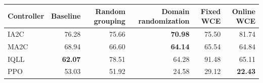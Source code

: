 \begin{tabular}{lrrrrr}
\hline
Controller & Baseline & Random grouping & Domain randomization & Fixed WCE & Online WCE \\
\hline
IA2C & 76.28 & 75.66 & \textbf{70.98} & 75.50 & 81.74 \\
MA2C & 68.94 & 66.60 & \textbf{64.14} & 65.54 & 64.84 \\
IQLL & \textbf{62.07} & 78.51 & 64.28 & 91.48 & 65.11 \\
PPO & 53.03 & 51.92 & 24.58 & 29.12 & \textbf{22.43} \\
\hline
\end{tabular}
